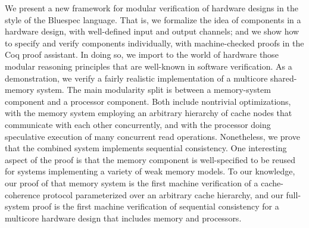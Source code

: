We present a new framework for modular verification of hardware designs
in the style of the Bluespec language.  That is, we formalize the idea of
components in a hardware design, with well-defined input and output channels;
and we show how to specify and verify components individually, with
machine-checked proofs in the Coq proof assistant.  In doing so, we import
to the world of hardware those modular reasoning principles that are
well-known in software verification.  As a demonstration, we verify a
fairly realistic implementation of a multicore shared-memory system.  The
main modularity split is between a memory-system component and a processor
component.  Both include nontrivial optimizations, with the memory system
employing an arbitrary hierarchy of cache nodes that communicate with each
other concurrently, and with the processor doing speculative execution of
many concurrent read operations.  Nonetheless, we prove that the combined
system implements sequential consistency.  One interesting aspect of the proof
is that the memory component is well-specified to be reused for systems
implementing a variety of weak memory models.  To our knowledge, our proof
of that memory system is the first machine verification of a cache-coherence
protocol parameterized over an arbitrary cache hierarchy, and our full-system
proof is the first machine verification of sequential consistency for a
multicore hardware design that includes memory and processors.
